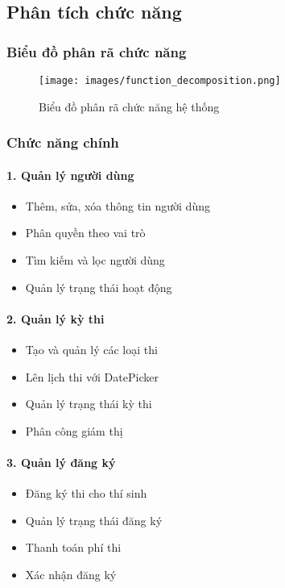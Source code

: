 \documentclass[12pt,a4paper]{article}
\begin{document}
\subsection{Phân tích chức năng}

\subsubsection{Biểu đồ phân rã chức năng}

\begin{figure}[H]
\centering
\texttt{[image: images/function\_decomposition.png]}
\caption{Biểu đồ phân rã chức năng hệ thống}
\label{fig:function_decomposition}
\end{figure}

\subsubsection{Chức năng chính}

\paragraph{1. Quản lý người dùng}
\begin{itemize}
    \item Thêm, sửa, xóa thông tin người dùng
    \item Phân quyền theo vai trò
    \item Tìm kiếm và lọc người dùng
    \item Quản lý trạng thái hoạt động
\end{itemize}

\paragraph{2. Quản lý kỳ thi}
\begin{itemize}
    \item Tạo và quản lý các loại thi
    \item Lên lịch thi với DatePicker
    \item Quản lý trạng thái kỳ thi
    \item Phân công giám thị
\end{itemize}

\paragraph{3. Quản lý đăng ký}
\begin{itemize}
    \item Đăng ký thi cho thí sinh
    \item Quản lý trạng thái đăng ký
    \item Thanh toán phí thi
    \item Xác nhận đăng ký
\end{itemize}
\end{document}
